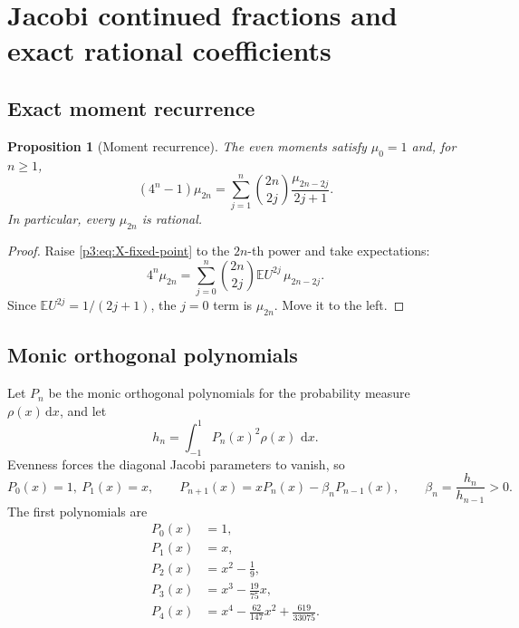 \documentclass[11pt,oneside]{article}
\newtheorem{proposition}[theorem]{Proposition}
\theoremstyle{definition}
\newcommand{\dd}{\,\mathrm d}
\newcommand{\E}{\mathbb E}
\begin{document}
\section{Jacobi continued fractions and exact rational coefficients}\label{p3:sec:jacobi}

\subsection{Exact moment recurrence}

\begin{proposition}[Moment recurrence]\label{p3:prop:moment-recurrence}
The even moments satisfy \(\mu_0=1\) and, for \(n\ge1\),
\begin{equation}
 \boxed{
 (4^n-1)\mu_{2n}
 =\sum_{j=1}^{n}\binom{2n}{2j}\frac{\mu_{2n-2j}}{2j+1}.
 }                                                           \label{p3:eq:moment-recurrence}
\end{equation}
In particular, every \(\mu_{2n}\) is rational.
\end{proposition}

\begin{proof}
Raise \eqref{p3:eq:X-fixed-point} to the \(2n\)-th power and take expectations:
\[
 4^n\mu_{2n}
 =\sum_{j=0}^{n}\binom{2n}{2j}\E U^{2j}\,\mu_{2n-2j}.
\]
Since \(\E U^{2j}=1/(2j+1)\), the \(j=0\) term is \(\mu_{2n}\).  Move it to the left.
\end{proof}

\subsection{Monic orthogonal polynomials}

Let \(P_n\) be the monic orthogonal polynomials for the probability measure
\(\rho(x)\dd x\), and let
\begin{equation}
 h_n=\int_{-1}^{1}P_n(x)^2\rho(x)\,\dd x.                    \label{p3:eq:hn}
\end{equation}
Evenness forces the diagonal Jacobi parameters to vanish, so
\begin{equation}
 P_0(x)=1,\
 P_1(x)=x,
 \qquad
 P_{n+1}(x)=xP_n(x)-\beta_nP_{n-1}(x),
 \qquad
 \beta_n=\frac{h_n}{h_{n-1}}>0.                              \label{p3:eq:monic-recurrence}
\end{equation}
The first polynomials are
\begin{align}
 P_0(x)&=1,\\
 P_1(x)&=x,\\
 P_2(x)&=x^2-\frac19,\\
 P_3(x)&=x^3-\frac{19}{75}x,\\
 P_4(x)&=x^4-\frac{62}{147}x^2+\frac{619}{33075}.
\end{align}
\end{document}
